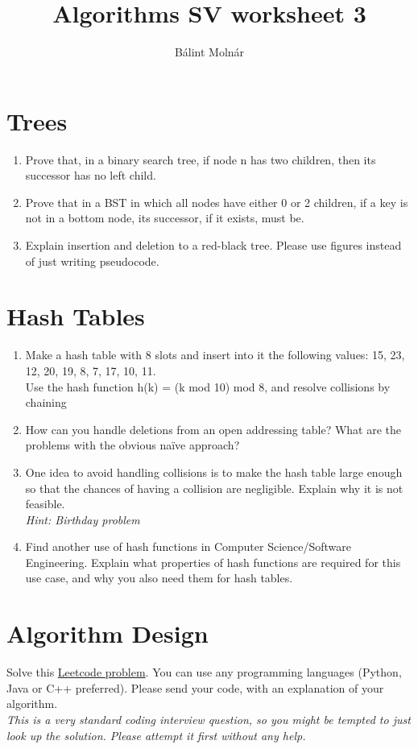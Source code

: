 \documentclass{article}
\title{{Algorithms SV worksheet 3}}
\author{Bálint Molnár}
\begin{document}
\maketitle


\section{Trees}

\begin{enumerate}
   \item Prove that, in a binary search tree, if node n has two children, then
its successor has no left child.
\item Prove that in a BST in which all nodes have either 0 or 2 children, if a key is not in a bottom node, its successor, if it exists, must be.
\item Explain insertion and deletion to a red-black tree. Please use figures instead of just writing pseudocode.

\end{enumerate}

\section{Hash Tables}

\begin{enumerate}
    \item Make a hash table with 8 slots and insert into it the following values:
15, 23, 12, 20, 19, 8, 7, 17, 10, 11.\\
Use the hash function 
h(k) = (k mod 10) mod 8,
and resolve collisions by chaining
\item How can you handle deletions from an open addressing table? What are the
problems with the obvious naïve approach?
\item One idea to avoid handling collisions is to make the hash table large enough so that the chances of having a collision are negligible. Explain why it is not feasible.\\
\emph{Hint: Birthday problem}

\item Find another use of hash functions in Computer Science/Software Engineering. Explain what properties of hash functions are required for this use case, and why you also need them for hash tables.
\end{enumerate}
\section{Algorithm Design}
Solve this \href{https://leetcode.com/problems/lru-cache/description/}{Leetcode problem}. You can use any programming languages (Python, Java or C++ preferred). Please send your code, with an explanation of your algorithm.\\
\emph{This is a very standard coding interview question, so you might be tempted to just look up the solution. Please attempt it first without any help.}
\end{document}
